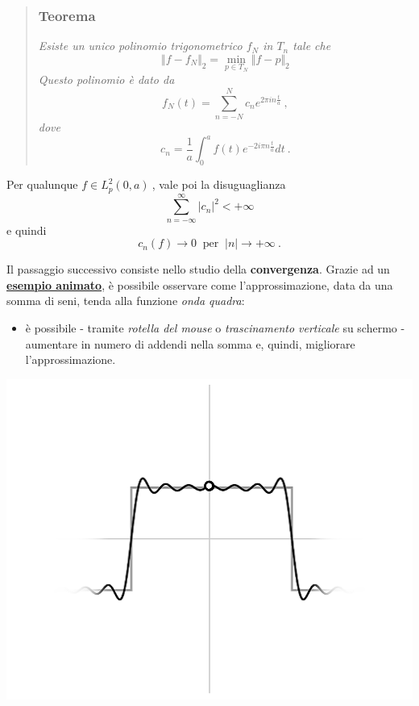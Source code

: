 \documentclass[
]{book}
\providecommand{\tightlist}{%
  \setlength{\itemsep}{0pt}\setlength{\parskip}{0pt}}
\begin{document}
\begin{quote}
\hypertarget{teorema}{%
\subsubsection*{Teorema}\label{teorema}}

\emph{Esiste un unico polinomio trigonometrico \(f_N\) in \(T_n\) tale che}
\[ \Vert f - f_N \Vert _{2} = \min_{p \in T_N} \Vert f - p \Vert _{2} \]
\emph{Questo polinomio è dato da}
\begin{equation}
f_{N}(t)=\sum_{n=-N}^{N} c_{n}e^{2\pi in \textstyle \frac {t}{a}} \ ,
\label{eq:polsol}
\end{equation}
\emph{dove}
\begin{equation}
c_n=\frac{1}{a} \int_{0}^{a}f(t)e^{-2 i \pi n \textstyle \frac {t}{a}}dt \ .
\label{eq:coeffsol}
\end{equation}
\end{quote}

Per qualunque \(f \in L_{p}^{2}(0,a) \ \), vale poi la disuguaglianza
\[ \sum_{n=-\infty}^{\infty} |c_n|^{2} < + \infty \]
e quindi
\[ c_n(f) \rightarrow 0 \ \text{ per } \ |n| \rightarrow + \infty \ . \]

Il passaggio successivo consiste nello studio della \textbf{convergenza}.
Grazie ad un \href{https://bradwave.github.io/thesis/\#/esempio-animato}{\textbf{esempio animato}}, è possibile osservare come l'approssimazione, data da una somma di seni, tenda alla funzione \emph{onda quadra}:

\begin{itemize}
\tightlist
\item
  è possibile - tramite \emph{rotella del mouse} o \emph{trascinamento verticale} su schermo - aumentare in numero di addendi nella somma e, quindi, migliorare l'approssimazione.
\end{itemize}

\begin{center}\includegraphics[width=0.5\linewidth]{_images/approx} \end{center}
\end{document}
